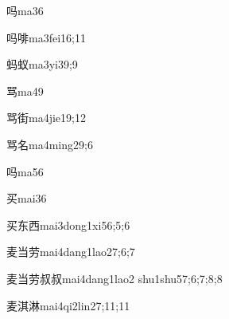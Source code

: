 \begin{verbete}{吗}{ma3}{6}
\end{verbete}

\begin{verbete}{吗啡}{ma3fei1}{6;11}
\end{verbete}

\begin{verbete}{蚂蚁}{ma3yi3}{9;9}
\end{verbete}

\begin{verbete}{骂}{ma4}{9}
\end{verbete}

\begin{verbete}{骂街}{ma4jie1}{9;12}
\end{verbete}

\begin{verbete}{骂名}{ma4ming2}{9;6}
\end{verbete}

\begin{verbete}{吗}{ma5}{6}
\end{verbete}

\begin{verbete}{买}{mai3}{6}
\end{verbete}

\begin{verbete}{买东西}{mai3dong1xi5}{6;5;6}
\end{verbete}

\begin{verbete}{麦当劳}{mai4dang1lao2}{7;6;7}
\end{verbete}

\begin{verbete}{麦当劳叔叔}{mai4dang1lao2 shu1shu5}{7;6;7;8;8}
\end{verbete}

\begin{verbete}{麦淇淋}{mai4qi2lin2}{7;11;11}
\end{verbete}

